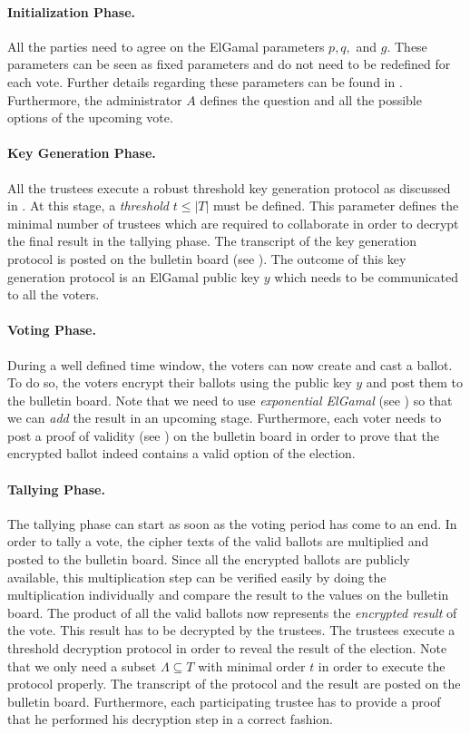 \documentclass[numbers=noenddot, abstract=on, a4paper, headsepline,
footsepline, oneside, openright, draft=off, listof=leveldown]{scrreprt}
\newcommand{\myref}[1]{(see \Vref{#1})}
\begin{document}
\paragraph{Initialization Phase.}
All the parties need to agree on the ElGamal parameters $p, q,$ and $g$. These
parameters can be seen as fixed parameters and do not need to be redefined for
each vote. Further details regarding these parameters can be found in
. Furthermore, the administrator $A$ defines the question and
all the possible options of the upcoming vote.

\paragraph{Key Generation Phase.}
All the trustees execute a robust threshold key generation protocol as discussed
in . At this stage, a \emph{threshold}
$t\leq|T|$ must be defined. This parameter defines the minimal number of
trustees which are required to collaborate in order to decrypt the final result
in the tallying phase.
The transcript of the key generation protocol is posted on the bulletin board
\myref{sec:bulletinboard}. The outcome of this key generation protocol is an
ElGamal public key $y$ which needs to be communicated to all the voters.

\paragraph{Voting Phase.}
During a well defined time window, the voters can now create and cast a ballot.
To do so, the voters encrypt their ballots using the public key $y$ and post
them to the bulletin board. Note that we need to use \emph{exponential
ElGamal} \myref{sec:expelgamal} so that we can \emph{add} the result in an upcoming
stage.
Furthermore, each voter needs to post a proof of validity
\myref{sec:proofofvalidity} on the bulletin board in order to prove that
the encrypted ballot indeed contains a valid option of the election.

\paragraph{Tallying Phase.}
The tallying phase can start as soon as the voting period has come to an end. In
order to tally a vote, the cipher texts of the valid ballots are multiplied
and posted to the bulletin board. Since all the encrypted ballots are publicly
available, this multiplication step can be verified easily by doing the
multiplication individually and compare the result to the values on the
bulletin board. The product of all the valid ballots now represents the
\emph{encrypted result} of the vote. This result has to be decrypted by the
trustees. The trustees execute a threshold decryption
protocol in order to reveal the result of the election. Note that we only need a subset $\Lambda \subseteq T$ with minimal order $t$ in order to execute the
protocol properly. The transcript of the protocol and the result are posted on
the bulletin board. Furthermore, each participating trustee has to provide a
proof that he performed his decryption step in a correct fashion.
\end{document}
